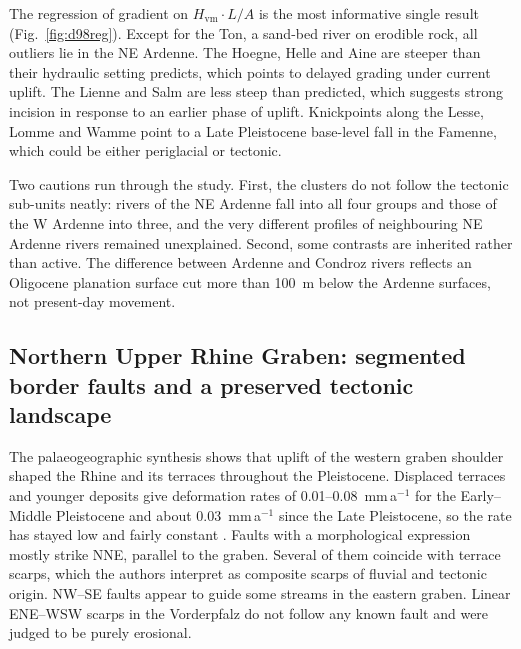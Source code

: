 \documentclass[10pt,a4paper,twocolumn]{article}
\newcommand{\Hvm}{\ensuremath{H_\mathrm{vm}}}
\begin{document}
The regression of gradient on $\Hvm\cdot L/A$ is the most informative single result
(Fig.~\ref{fig:d98reg}). Except for the Ton, a sand-bed river on erodible rock, all outliers lie in the NE
Ardenne. The Hoegne, Helle and Aine are steeper than their hydraulic setting predicts, which points to
delayed grading under current uplift. The Lienne and Salm are less steep than predicted, which
suggests strong incision in response to an earlier phase of uplift. Knickpoints along the Lesse,
Lomme and Wamme point to a Late Pleistocene base-level fall in the Famenne, which could be either
periglacial or tectonic.

Two cautions run through the study. First, the clusters do not follow the tectonic sub-units neatly:
rivers of the NE Ardenne fall into all four groups and those of the W Ardenne into three, and the very different profiles of
neighbouring NE Ardenne rivers remained unexplained. Second, some contrasts are inherited rather than
active. The difference between Ardenne and Condroz rivers reflects an Oligocene planation surface cut
more than 100~m below the Ardenne surfaces, not present-day movement.

\subsection{Northern Upper Rhine Graben: segmented border faults and a preserved tectonic landscape}

The palaeogeographic synthesis shows that uplift of the western graben shoulder shaped the Rhine and
its terraces throughout the Pleistocene. Displaced terraces and younger deposits give deformation rates of 0.01--0.08~mm\,a$^{-1}$ for the
Early--Middle Pleistocene and about 0.03~mm\,a$^{-1}$ since the Late Pleistocene, so the rate has stayed low and fairly constant \citep{PetersVanBalen2007}. Faults with
a morphological expression mostly strike NNE, parallel to the graben. Several of them coincide with
terrace scarps, which the authors interpret as composite scarps of fluvial and tectonic origin.
NW--SE faults appear to guide some streams in the eastern graben. Linear ENE--WSW scarps in the
Vorderpfalz do not follow any known fault and were judged to be purely erosional.
\end{document}

